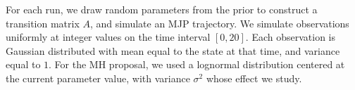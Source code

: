 For each run, we draw random parameters from the prior to construct a transition matrix $A$, and simulate an MJP trajectory.
We simulate observations uniformly at integer values on the time interval $[0, 20]$. 
Each observation is Gaussian distributed with mean equal to the state at that time, and variance equal to $1$.  
For the MH proposal, we used a lognormal distribution centered at the current parameter value, with variance $\sigma^2$ whose effect we study.  

